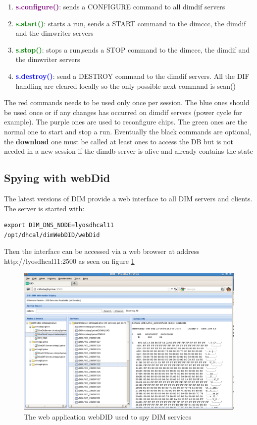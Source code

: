 \documentclass[english]{article}
\begin{document}
\begin{enumerate}
\item \textcolor{purple}{\bf s.configure()}: sends a CONFIGURE command to all dimdif servers




\item \textcolor{green}{\bf s.start()}: starts a run, sends a START command to the dimccc, the dimdif and the dimwriter servers 

\item \textcolor{green}{\bf s.stop()}: stops a run,sends a STOP command to the dimccc, the dimdif and the dimwriter servers
\item \textcolor{blue}{\bf s.destroy()}: send a DESTROY command to the dimdif servers. All the DIF handling are cleared locally so the only possible next command is scan()
\end{enumerate} 

The red commands needs to be used only once per session. The blue ones should be used once or if any changes has occurred on dimdif servers (power cycle for example). The purple ones are used to reconfigure chips. The green ones are the normal one to start and stop a run. Eventually the black commands are optional, the {\bf download} one must be called at least ones to access the DB but is not needed in a new session if the dimdb server is alive and already contains the state 


\subsection{Spying with webDid}
The latest versions of DIM provide a web interface to all DIM servers and clients. The server is started with:
\begin{verbatim}
export DIM_DNS_NODE=lyosdhcal11
/opt/dhcal/dimWebDID/webDid
\end{verbatim}

Then the interface can be accessed via a web browser at address http://lyosdhcal11:2500 as seen on figure \ref{webdid}
\begin{figure}[htp]
\centering
\includegraphics[width=1.3\textwidth]{./webDid.png}
\caption{The web application webDID used to spy DIM services}
\label{webdid}
\end{figure}
\end{document}
